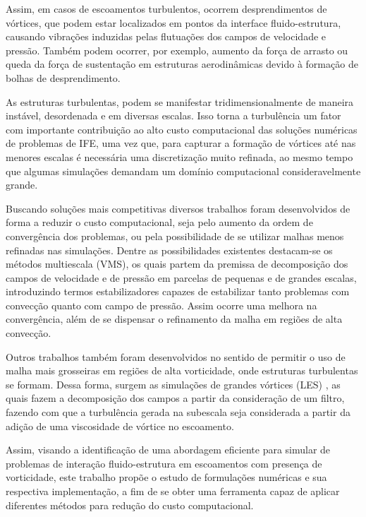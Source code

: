 Assim, em casos de escoamentos turbulentos, ocorrem desprendimentos de vórtices, que podem estar localizados em pontos da interface fluido-estrutura, causando vibrações induzidas pelas flutuações dos campos de velocidade e pressão. Também podem ocorrer, por exemplo, aumento da força de arrasto ou queda da força de sustentação em estruturas aerodinâmicas devido à formação de bolhas de desprendimento.

As estruturas turbulentas, podem se manifestar tridimensionalmente de maneira instável, desordenada e em diversas escalas. Isso torna a turbulência um fator com importante contribuição ao alto custo computacional das soluções numéricas de problemas de IFE, uma vez que, para capturar a formação de vórtices até nas menores escalas é necessária uma discretização muito refinada, ao mesmo tempo que algumas simulações demandam um domínio computacional consideravelmente grande.

Buscando soluções mais competitivas diversos trabalhos foram desenvolvidos de forma a reduzir o custo computacional, seja pelo aumento da ordem de convergência dos problemas, ou pela possibilidade de se utilizar malhas menos refinadas nas simulações. Dentre as possibilidades existentes destacam-se os métodos multiescala (VMS), os quais partem da premissa de decomposição dos campos de velocidade e de pressão em parcelas de pequenas e de grandes escalas, introduzindo termos estabilizadores capazes de estabilizar tanto problemas com convecção quanto com campo de pressão. Assim ocorre uma melhora na convergência, além de se dispensar o refinamento da malha em regiões de alta convecção.

Outros trabalhos também foram desenvolvidos no sentido de permitir o uso de malha mais grosseiras em regiões de alta vorticidade, onde estruturas turbulentas se formam. Dessa forma, surgem as simulações de grandes vórtices (LES) \cite{smagorinsky1963general}, as quais fazem a decomposição dos campos a partir da consideração de um filtro, fazendo com que a turbulência gerada na subescala seja considerada a partir da adição de uma viscosidade de vórtice no escoamento.

Assim, visando a identificação de uma abordagem eficiente para simular de problemas de interação fluido-estrutura em escoamentos com presença de vorticidade, este trabalho propõe o estudo de formulações numéricas e sua respectiva implementação, a fim de se obter uma ferramenta capaz de aplicar diferentes métodos para redução do custo computacional.

